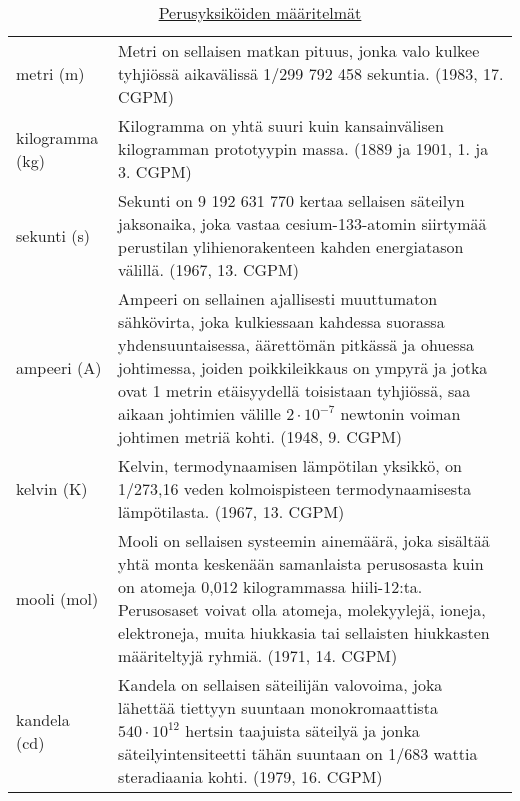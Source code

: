 \begin{table}[ht!]
\centering
\setlength{\extrarowheight}{5pt}
\caption{\href{https://en.wikipedia.org/wiki/SI_base_unit}{Perusyksiköiden määritelmät} \cite[s. 64-65]{MAOL} }
\begin{tabu} to \textwidth {lX}
\hline
metri (m)		& Metri on sellaisen matkan pituus, jonka valo kulkee tyhjiössä aikavälissä 1/299 792 458 sekuntia. \newline (1983, 17. CGPM) \\

kilogramma (kg)	& Kilogramma on yhtä suuri kuin kansainvälisen kilogramman prototyypin massa. \newline (1889 ja 1901, 1. ja 3. CGPM) \\

sekunti (s)		& Sekunti on 9 192 631 770 kertaa sellaisen säteilyn jaksonaika, joka vastaa cesium-133-atomin siirtymää perustilan ylihienorakenteen kahden energiatason välillä. \newline (1967, 13. CGPM) \\

ampeeri (A)		& Ampeeri on sellainen ajallisesti muuttumaton sähkövirta, joka kulkiessaan kahdessa suorassa yhdensuuntaisessa, äärettömän pitkässä ja ohuessa johtimessa, joiden poikkileikkaus on ympyrä ja jotka ovat 1 metrin etäisyydellä toisistaan tyhjiössä, saa aikaan johtimien välille $2 \cdot 10^{-7}$ newtonin voiman johtimen metriä kohti. \newline (1948, 9. CGPM) \\

kelvin (K)		& Kelvin, termodynaamisen lämpötilan yksikkö, on 1/273,16 veden kolmoispisteen termodynaamisesta lämpötilasta. \newline (1967, 13. CGPM) \\

mooli (mol)		& Mooli on sellaisen systeemin ainemäärä, joka sisältää yhtä monta keskenään samanlaista perusosasta kuin on atomeja 0,012 kilogrammassa hiili-12:ta. Perusosaset voivat olla atomeja, molekyylejä, ioneja, elektroneja, muita hiukkasia tai sellaisten hiukkasten määriteltyjä ryhmiä. \newline (1971, 14. CGPM) \\

kandela (cd)	& Kandela on sellaisen säteilijän valovoima, joka lähettää tiettyyn suuntaan monokromaattista $540 \cdot 10^{12}$ hertsin taajuista säteilyä ja jonka säteilyintensiteetti tähän suuntaan on 1/683 wattia steradiaania kohti. \newline (1979, 16. CGPM) \\
\end{tabu}

\end{table}


